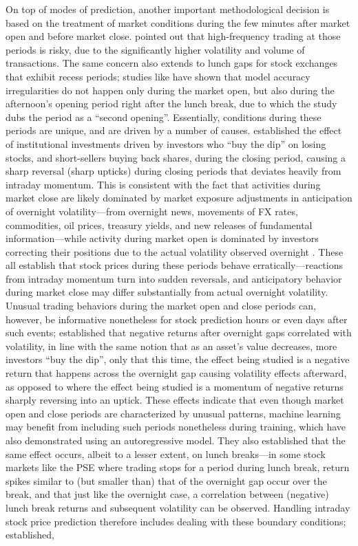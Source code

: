\documentclass[stu,floatsintext]{apa7}
\begin{document}
On top of modes of prediction, another important methodological decision is based on the treatment of market conditions during the few minutes after market open and before market close. \textcite{olorunnimbe2022deep} pointed out that high-frequency trading at those periods is risky, due to the significantly higher volatility and volume of transactions. The same concern also extends to lunch gaps for stock exchanges that exhibit recess periods; studies like \textcite{wang2026highfrequency} have shown that model accuracy irregularities do not happen only during the market open, but also during the afternoon's opening period right after the lunch break, due to which the study dubs the period as a ``second opening''. Essentially, conditions during these periods are unique, and are driven by a number of causes. \textcite{soebhag2024endofday} established the effect of institutional investments driven by investors who “buy the dip” on losing stocks, and short-sellers buying back shares, during the closing period, causing a sharp reversal (sharp upticks) during closing periods that deviates heavily from intraday momentum. This is consistent with the fact that activities during market close are likely dominated by market exposure adjustments in anticipation of overnight volatility—from overnight news, movements of FX rates, commodities, oil prices, treasury yields, and new releases of fundamental information—while activity during market open is dominated by investors correcting their positions due to the actual volatility observed overnight \parencite{gerety1992trading}. These all establish that stock prices during these periods behave erratically—reactions from intraday momentum turn into sudden reversals, and anticipatory behavior during market close may differ substantially from actual overnight volatility. Unusual trading behaviors during the market open and close periods can, however, be informative nonetheless for stock prediction hours or even days after such events; \textcite{wang2015volatility} established that negative returns after overnight gaps correlated with volatility, in line with the same notion that as an asset’s value decreases, more investors “buy the dip”, only that this time, the effect being studied is a negative return that happens across the overnight gap causing volatility effects afterward, as opposed to \textcite{soebhag2024endofday} where the effect being studied is a momentum of negative returns sharply reversing into an uptick. These effects indicate that even though market open and close periods are characterized by unusual patterns, machine learning may benefit from including such periods nonetheless during training, which \textcite{wang2015volatility} have also demonstrated using an autoregressive model. They also established that the same effect occurs, albeit to a lesser extent, on lunch breaks—in some stock markets like the PSE where trading stops for a period during lunch break, return spikes similar to (but smaller than) that of the overnight gap occur over the break, and that just like the overnight case, a correlation between (negative) lunch break returns and subsequent volatility can be observed. Handling intraday stock price prediction therefore includes dealing with these boundary conditions; \textcite{huddleston2021intraday} established, 
\end{document}
